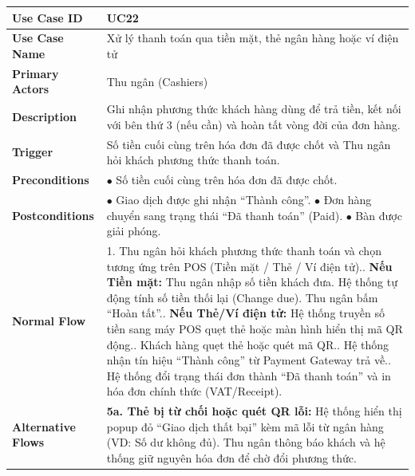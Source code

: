 \begin{longtable}{|p{3.5cm}|p{12.5cm}|}
\hline
\textbf{Use Case ID} & UC22 \\ \hline
\textbf{Use Case Name} & Xử lý thanh toán qua tiền mặt, thẻ ngân hàng hoặc ví điện tử \\ \hline
\textbf{Primary Actors} & Thu ngân (Cashiers) \\ \hline
\textbf{Description} & Ghi nhận phương thức khách hàng dùng để trả tiền, kết nối với bên thứ 3 (nếu cần) và hoàn tất vòng đời của đơn hàng. \\ \hline
\textbf{Trigger} & Số tiền cuối cùng trên hóa đơn đã được chốt và Thu ngân hỏi khách phương thức thanh toán. \\ \hline
\textbf{Preconditions} & $\bullet$ Số tiền cuối cùng trên hóa đơn đã được chốt. \\ \hline
\textbf{Postconditions} &
$\bullet$ Giao dịch được ghi nhận ``Thành công''.\newline
$\bullet$ Đơn hàng chuyển sang trạng thái ``Đã thanh toán'' (Paid).\newline
$\bullet$ Bàn được giải phóng. \\ \hline
\textbf{Normal Flow} &
1. Thu ngân hỏi khách phương thức thanh toán và chọn tương ứng trên POS (Tiền mặt / Thẻ / Ví điện tử).\newline
2. \textbf{Nếu Tiền mặt:} Thu ngân nhập số tiền khách đưa. Hệ thống tự động tính số tiền thối lại (Change due). Thu ngân bấm ``Hoàn tất''.\newline
3. \textbf{Nếu Thẻ/Ví điện tử:} Hệ thống truyền số tiền sang máy POS quẹt thẻ hoặc màn hình hiển thị mã QR động.\newline
4. Khách hàng quẹt thẻ hoặc quét mã QR.\newline
5. Hệ thống nhận tín hiệu ``Thành công'' từ Payment Gateway trả về.\newline
6. Hệ thống đổi trạng thái đơn thành ``Đã thanh toán'' và in hóa đơn chính thức (VAT/Receipt). \\ \hline
\textbf{Alternative Flows} &
\textbf{5a. Thẻ bị từ chối hoặc quét QR lỗi:} Hệ thống hiển thị popup đỏ ``Giao dịch thất bại'' kèm mã lỗi từ ngân hàng (VD: Số dư không đủ). Thu ngân thông báo khách và hệ thống giữ nguyên hóa đơn để chờ đổi phương thức. \\ \hline
\end{longtable}




